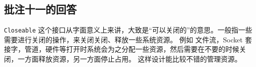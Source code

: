 \subsection{批注十一的回答}
\label{sec:fix:bl11}

\lstinline|Closeable| 这个接口从字面意义上来讲，大致是“可以关闭的”的意思。一般指一些需要进行关闭的操作，来关闭关闭、释放一些系统资源。
例如 文件流，Socket 套接字，管道，硬件等打开时系统会为之分配一些资源，然后需要在不要的时候关闭，一方面释放资源，另一方面停止占用。
这样设计能比较不错的管理资源。